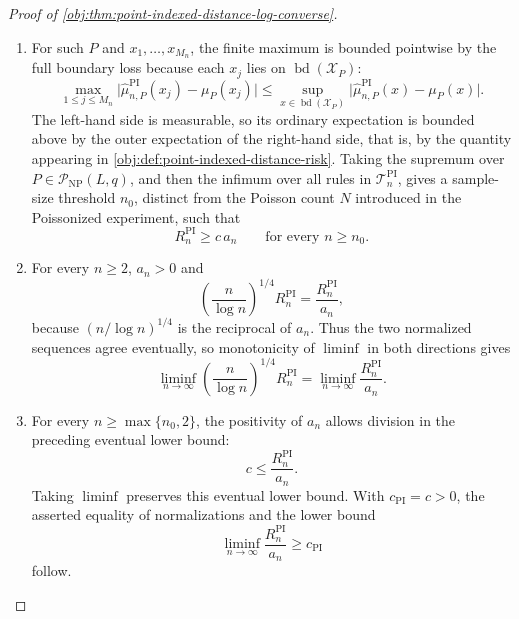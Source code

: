 \begin{proof}[Proof of \cref{obj:thm:point-indexed-distance-log-converse}]
\begin{enumerate}
\item
For such \(P\) and \(x_1,\ldots,x_{M_n}\), the finite maximum is bounded pointwise by the full boundary loss because each \(x_j\) lies on \(\operatorname{bd}(\mathcal X_P)\):
\[
\max_{1\le j\le M_n}\bigl|\widehat\mu^{\mathrm{PI}}_{n,P}(x_j)-\mu_P(x_j)\bigr|
\le
\sup_{x\in\operatorname{bd}(\mathcal X_P)}\bigl|\widehat\mu^{\mathrm{PI}}_{n,P}(x)-\mu_P(x)\bigr| .
\]
The left-hand side is measurable, so its ordinary expectation is bounded above by the outer expectation of the right-hand side, that is, by the quantity appearing in \cref{obj:def:point-indexed-distance-risk}.  Taking the supremum over \(P\in\mathcal P_{\mathrm{NP}}(L,q)\), and then the infimum over all rules in \(\mathcal T_n^{\mathrm{PI}}\), gives a sample-size threshold \(n_0\), distinct from the Poisson count \(N\) introduced in the Poissonized experiment, such that
\[
R_n^{\mathrm{PI}}\geq c\,a_n
\qquad\text{for every } n\geq n_0 .
\]

\item
For every \(n\geq2\), \(a_n>0\) and
\[
\left(\frac{n}{\log n}\right)^{1/4}R_n^{\mathrm{PI}}
=
\frac{R_n^{\mathrm{PI}}}{a_n},
\]
because \((n/\log n)^{1/4}\) is the reciprocal of \(a_n\).  Thus the two normalized sequences agree eventually, so monotonicity of \(\liminf\) in both directions gives
\[
\liminf_{n\to\infty}
\left(\frac{n}{\log n}\right)^{1/4}R_n^{\mathrm{PI}}
=
\liminf_{n\to\infty}\frac{R_n^{\mathrm{PI}}}{a_n}.
\]

\item
For every \(n\geq \max\{n_0,2\}\), the positivity of \(a_n\) allows division in the preceding eventual lower bound:
\[
c\leq \frac{R_n^{\mathrm{PI}}}{a_n}.
\]
Taking \(\liminf\) preserves this eventual lower bound.  With \(c_{\mathrm{PI}}=c>0\), the asserted equality of normalizations and the lower bound
\[
\liminf_{n\to\infty}\frac{R_n^{\mathrm{PI}}}{a_n}\geq c_{\mathrm{PI}}
\]
follow.
\end{enumerate}
\end{proof}

